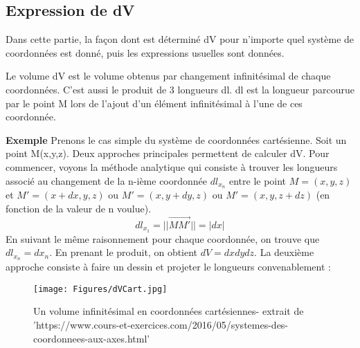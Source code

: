 \subsection{Expression de dV}
Dans cette partie, la façon dont est déterminé dV pour n'importe quel système de coordonnées est donné, puis les expressions usuelles sont données.

\begin{Prop}
\label{propDefDV}
Le volume dV est le volume obtenus par changement infinitésimal de chaque coordonnées. C'est aussi le produit de 3 longueurs dl. dl est la longueur parcourue par le point M lors de l'ajout d'un élément infinitésimal à l'une de ces coordonnée.
\end{Prop}

\textbf{Exemple}\newline
Prenons le cas simple du système de coordonnées cartésienne. Soit un point M(x,y,z). Deux approches principales permettent de calculer dV. Pour commencer, voyons la méthode analytique qui consiste à trouver les longueurs associé au changement de la n-ième coordonnée $dl_{x_n}$ entre le point $M=(x,y,z)$ et $M'=(x+dx,y,z)$ ou $M'=(x,y+dy,z)$ ou $M'=(x,y,z+dz)$ (en fonction de la valeur de n voulue).
\begin{equation}
    dl_{x_1} = \lvert\lvert\overrightarrow{MM'}\rvert\rvert =  \lvert dx \rvert
\end{equation}
En suivant le même raisonnement pour chaque coordonnée, on trouve que $dl_{x_n} = dx_n$. En prenant le produit, on obtient $dV=dx dy dz$.
La deuxième approche consiste à faire un dessin et projeter le longueurs convenablement : 

\begin{figure}[H]
\begin{center}
\texttt{[image: Figures/dVCart.jpg]}
\caption{Un volume infinitésimal en coordonnées cartésiennes- extrait de  'https://www.cours-et-exercices.com/2016/05/systemes-des-coordonnees-aux-axes.html'}
\end{center}
\end{figure} 
